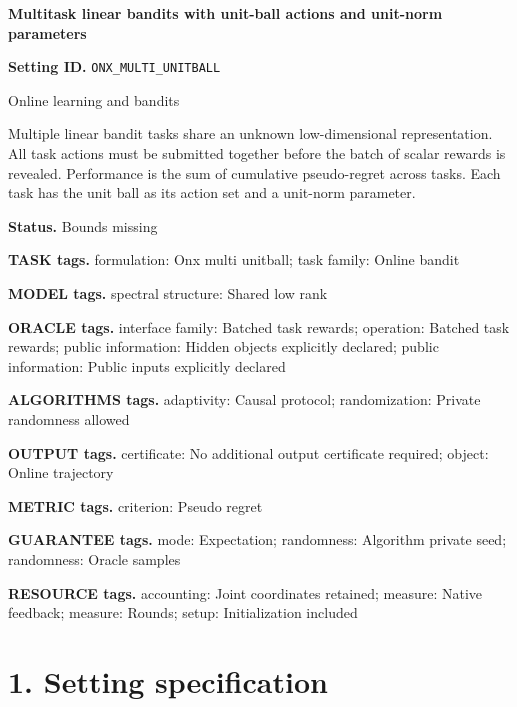 \documentclass[10pt,a4paper]{article}
\begin{document}
\raggedright

{\LARGE\bfseries\sffamily\color{AtlasNavy} Multitask linear bandits with unit-ball actions and unit-norm parameters\par}\vspace{5pt}


\textbf{Setting ID.} \texttt{ONX\_\allowbreak{}MULTI\_\allowbreak{}UNITBALL}



Online learning and bandits



Multiple linear bandit tasks share an unknown low-dimensional representation. All task actions must be submitted together before the batch of scalar rewards is revealed. Performance is the sum of cumulative pseudo-regret across tasks. Each task has the unit ball as its action set and a unit-norm parameter.



\textbf{Status.} Bounds missing



\textbf{TASK tags.} formulation: Onx multi unitball; task family: Online bandit



\textbf{MODEL tags.} spectral structure: Shared low rank



\textbf{ORACLE tags.} interface family: Batched task rewards; operation: Batched task rewards; public information: Hidden objects explicitly declared; public information: Public inputs explicitly declared



\textbf{ALGORITHMS tags.} adaptivity: Causal protocol; randomization: Private randomness allowed



\textbf{OUTPUT tags.} certificate: No additional output certificate required; object: Online trajectory



\textbf{METRIC tags.} criterion: Pseudo regret



\textbf{GUARANTEE tags.} mode: Expectation; randomness: Algorithm private seed; randomness: Oracle samples



\textbf{RESOURCE tags.} accounting: Joint coordinates retained; measure: Native feedback; measure: Rounds; setup: Initialization included



\section{1. Setting specification}
\end{document}
